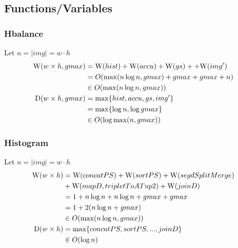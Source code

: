     \subsection*{Functions/Variables}

    \subsubsection*{Hbalance}
      Let $n = |img| = w\cdot h$
      \begin{equation}
      \begin{split}
      \W(w \times h,gmax)
            & = \W(hist) + \W(accu) + \W(gs) + \comment{\W(expandPS)} + \W(img') \\
            & = O( \max(n \log n, gmax) + gmax + gmax \comment{ + 1} + n) \\
            & \in O(\max(n \log n, gmax)) \\
      \D(w \times h,gmax)
          & = \max \{ hist, accu, gs\comment{, expandPS}, img'\} \\
          & = \max \{\log n, \log gmax \} \\
          & \in O(\log \max(n,gmax)) \\
      \end{split}
      \end{equation}
        
    \subsubsection*{Histogram}
      Let $n = |img| = w\cdot h$
      \begin{equation}
      \begin{split}
      \W(w \times h)
            & = \W(concatPS) + \W(sortPS) + \W(segdSplitMerge) \\
            & + \W(mapD,tripletToATup2) + \W(joinD) \\
            & = 1 + n \log n + n \log n + gmax + gmax \\
            & = 1 + 2 (n \log n + gmax) \\
            & \in O(\max(n \log n, gmax)) \\
      \D(w \times h)
            & = \max \{ concatPS,sortPS,...,joinD\} \\
            & \in O(\log n) \\
      \end{split}
      \end{equation}
    
